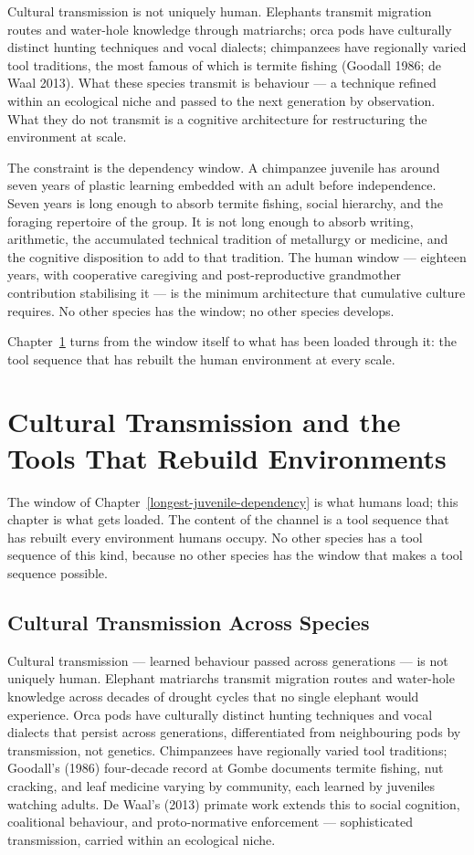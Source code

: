 \documentclass[12pt,letterpaper]{article}
\begin{document}
Cultural transmission is not uniquely human. Elephants transmit
migration routes and water-hole knowledge through matriarchs; orca
pods have culturally distinct hunting techniques and vocal dialects;
chimpanzees have regionally varied tool traditions, the most famous
of which is termite fishing (Goodall 1986; de Waal 2013). What these
species transmit is behaviour --- a technique refined within an
ecological niche and passed to the next generation by observation.
What they do not transmit is a cognitive architecture for restructuring
the environment at scale.

The constraint is the dependency window. A chimpanzee juvenile has
around seven years of plastic learning embedded with an adult before
independence. Seven years is long enough to absorb termite fishing,
social hierarchy, and the foraging repertoire of the group. It is not
long enough to absorb writing, arithmetic, the accumulated technical
tradition of metallurgy or medicine, and the cognitive disposition to
add to that tradition. The human window --- eighteen years, with
cooperative caregiving and post-reproductive grandmother contribution
stabilising it --- is the minimum architecture that cumulative culture
requires. No other species has the window; no other species develops.

Chapter~\ref{cultural-transmission} turns from the window itself to
what has been loaded through it: the tool sequence that has rebuilt
the human environment at every scale.

\section{Cultural Transmission and the Tools That Rebuild Environments}\label{cultural-transmission}

The window of Chapter~\ref{longest-juvenile-dependency} is what humans
load; this chapter is what gets loaded. The content of the channel
is a tool sequence that has rebuilt every environment humans occupy.
No other species has a tool sequence of this kind, because no other
species has the window that makes a tool sequence possible.

\subsection{Cultural Transmission Across Species}\label{cultural-transmission-across-species}

Cultural transmission --- learned behaviour passed across generations
--- is not uniquely human. Elephant matriarchs transmit migration
routes and water-hole knowledge across decades of drought cycles that
no single elephant would experience. Orca pods have culturally
distinct hunting techniques and vocal dialects that persist across
generations, differentiated from neighbouring pods by transmission,
not genetics. Chimpanzees have regionally varied tool traditions;
Goodall's (1986) four-decade record at Gombe documents termite
fishing, nut cracking, and leaf medicine varying by community, each
learned by juveniles watching adults. De Waal's (2013) primate work
extends this to social cognition, coalitional behaviour, and
proto-normative enforcement --- sophisticated transmission, carried
within an ecological niche.
\end{document}
